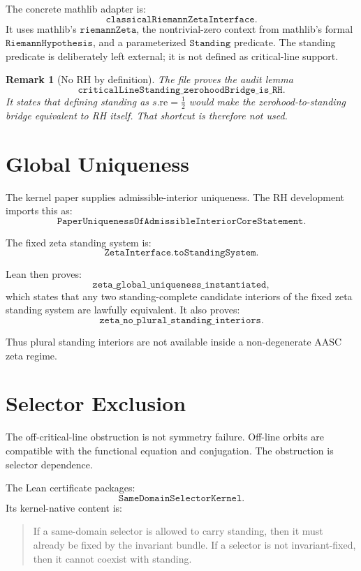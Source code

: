 \documentclass[11pt]{article}
\newtheorem{remark}{Remark}
\newcommand{\Half}{\tfrac12}
\begin{document}
The concrete mathlib adapter is:
\[
\texttt{classicalRiemannZetaInterface}.
\]
It uses mathlib's \(\texttt{riemannZeta}\), the nontrivial-zero context from
mathlib's formal \(\texttt{RiemannHypothesis}\), and a parameterized
\(\texttt{Standing}\) predicate.  The standing predicate is deliberately left
external; it is not defined as critical-line support.

\begin{remark}[No RH by definition]
The file proves the audit lemma
\[
\texttt{criticalLineStanding\_zerohoodBridge\_is\_RH}.
\]
It states that defining standing as \(s.\mathrm{re}=\Half\) would make the
zerohood-to-standing bridge equivalent to RH itself.  That shortcut is
therefore not used.
\end{remark}

\section{Global Uniqueness}

The kernel paper supplies admissible-interior uniqueness.  The RH development
imports this as:
\[
\texttt{PaperUniquenessOfAdmissibleInteriorCoreStatement}.
\]

The fixed zeta standing system is:
\[
\texttt{ZetaInterface.toStandingSystem}.
\]

Lean then proves:
\[
\texttt{zeta\_global\_uniqueness\_instantiated},
\]
which states that any two standing-complete candidate interiors of the fixed
zeta standing system are lawfully equivalent.  It also proves:
\[
\texttt{zeta\_no\_plural\_standing\_interiors}.
\]

Thus plural standing interiors are not available inside a non-degenerate AASC
zeta regime.

\section{Selector Exclusion}

The off-critical-line obstruction is not symmetry failure.  Off-line orbits
are compatible with the functional equation and conjugation.  The obstruction
is selector dependence.

The Lean certificate packages:
\[
\texttt{SameDomainSelectorKernel}.
\]
Its kernel-native content is:
\begin{quote}
If a same-domain selector is allowed to carry standing, then it must already
be fixed by the invariant bundle.  If a selector is not invariant-fixed, then
it cannot coexist with standing.
\end{quote}
\end{document}
